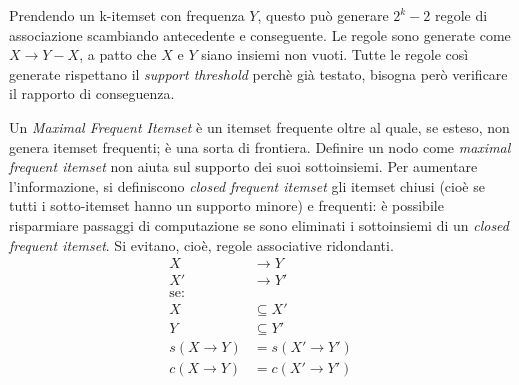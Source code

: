 \documentclass[11pt, a4page, twocolumn]{article}
\begin{document}
Prendendo un k-itemset con frequenza $Y$, questo può generare $2^k - 2$ regole di associazione scambiando antecedente e conseguente.
Le regole sono generate come $X \rightarrow Y - X$, a patto che $X$ e $Y$ siano insiemi non vuoti.
Tutte le regole così generate rispettano il \textit{support threshold} perchè già testato, bisogna però verificare il rapporto di conseguenza.

Un \textit{Maximal Frequent Itemset} è un itemset frequente oltre al quale, se esteso, non genera itemset frequenti; è una sorta di frontiera.
Definire un nodo come \textit{maximal frequent itemset} non aiuta sul supporto dei suoi sottoinsiemi.
Per aumentare l'informazione, si definiscono \textit{closed frequent itemset} gli itemset chiusi (cioè se tutti i sotto-itemset hanno un supporto minore) e frequenti: è possibile risparmiare passaggi di computazione se sono eliminati i sottoinsiemi di un \textit{closed frequent itemset}.
Si evitano, cioè, regole associative ridondanti.
\begin{align*}
  X &\rightarrow Y \\
  X' &\rightarrow Y' \\
  \text{se:}& \\
  X &\subseteq X' \\
  Y &\subseteq Y' \\
  s(X \rightarrow Y) &= s(X' \rightarrow Y') \\
  c(X \rightarrow Y) &= c(X' \rightarrow Y')
\end{align*}
\end{document}
